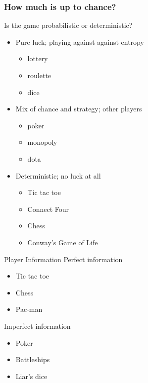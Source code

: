 \documentclass[compress]{beamer}
\newcommand{\blue}[1]{\textcolor{NordBlue}{#1}}
\newcommand{\red}[1]{\textcolor{NordRed}{#1}}
\newcommand{\yellow}[1]{\textcolor{NordYellow}{#1}}
\newcommand{\magenta}[1]{\textcolor{NordMagenta}{#1}}
\newcommand{\cyan}[1]{\textcolor{NordCyan}{#1}}
\begin{document}
\begin{frame}[fragile]
\frametitle{How much is up to chance?}

Is the game \red{probabilistic} or \blue{deterministic}?
\medskip
\begin{itemize}
\item \magenta{Pure luck}; playing against against entropy
\begin{itemize}
    \item lottery
    \item roulette
    \item dice
\end{itemize}

\item \cyan{Mix} of chance and strategy; other players
\begin{itemize}
    \item poker
    \item monopoly
    \item dota
\end{itemize}

\item \blue{Deterministic}; no luck at all
\begin{itemize}
    \item Tic tac toe
    \item Connect Four
    \item Chess
    \item Conway's Game of Life
\end{itemize}
\end{itemize}

\end{frame}

\begin{frame}{Player Information}
\yellow{Perfect information}
\begin{itemize}
    \item Tic tac toe
    \item Chess
    \item Pac-man
\end{itemize}
\bigskip
\magenta{Imperfect information}
\begin{itemize}
    \item Poker
    \item Battleships
    \item Liar's dice
\end{itemize}
\end{frame}
\end{document}
